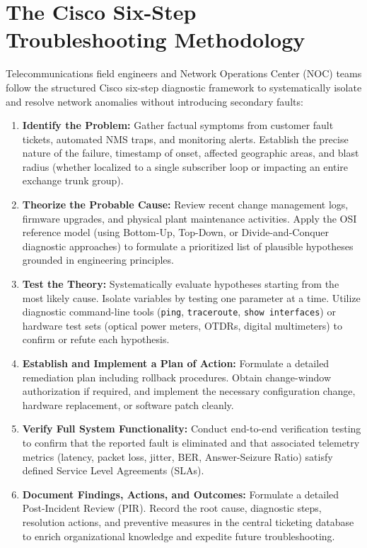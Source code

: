 \documentclass[12pt,a4paper]{report}
\begin{document}
\section{The Cisco Six-Step Troubleshooting Methodology}
Telecommunications field engineers and Network Operations Center (NOC) teams follow the structured Cisco six-step diagnostic framework to systematically isolate and resolve network anomalies without introducing secondary faults:

\begin{enumerate}
    \item \textbf{Identify the Problem:} Gather factual symptoms from customer fault tickets, automated NMS traps, and monitoring alerts. Establish the precise nature of the failure, timestamp of onset, affected geographic areas, and blast radius (whether localized to a single subscriber loop or impacting an entire exchange trunk group).
    
    \item \textbf{Theorize the Probable Cause:} Review recent change management logs, firmware upgrades, and physical plant maintenance activities. Apply the OSI reference model (using Bottom-Up, Top-Down, or Divide-and-Conquer diagnostic approaches) to formulate a prioritized list of plausible hypotheses grounded in engineering principles.
    
    \item \textbf{Test the Theory:} Systematically evaluate hypotheses starting from the most likely cause. Isolate variables by testing one parameter at a time. Utilize diagnostic command-line tools (\texttt{ping}, \texttt{traceroute}, \texttt{show interfaces}) or hardware test sets (optical power meters, OTDRs, digital multimeters) to confirm or refute each hypothesis.
    
    \item \textbf{Establish and Implement a Plan of Action:} Formulate a detailed remediation plan including rollback procedures. Obtain change-window authorization if required, and implement the necessary configuration change, hardware replacement, or software patch cleanly.
    
    \item \textbf{Verify Full System Functionality:} Conduct end-to-end verification testing to confirm that the reported fault is eliminated and that associated telemetry metrics (latency, packet loss, jitter, BER, Answer-Seizure Ratio) satisfy defined Service Level Agreements (SLAs).
    
    \item \textbf{Document Findings, Actions, and Outcomes:} Formulate a detailed Post-Incident Review (PIR). Record the root cause, diagnostic steps, resolution actions, and preventive measures in the central ticketing database to enrich organizational knowledge and expedite future troubleshooting.
\end{enumerate}
\end{document}
